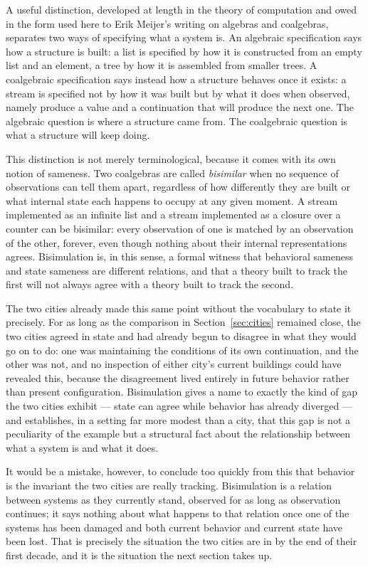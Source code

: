 \documentclass[11pt]{article}
\begin{document}
A useful distinction, developed at length in the theory of computation
and owed in the form used here to Erik Meijer's writing on algebras
and coalgebras, separates two ways of specifying what a system is. An
algebraic specification says how a structure is built: a list is
specified by how it is constructed from an empty list and an element,
a tree by how it is assembled from smaller trees. A coalgebraic
specification says instead how a structure behaves once it exists: a
stream is specified not by how it was built but by what it does when
observed, namely produce a value and a continuation that will produce
the next one. The algebraic question is where a structure came from.
The coalgebraic question is what a structure will keep doing.

This distinction is not merely terminological, because it comes with
its own notion of sameness. Two coalgebras are called \emph{bisimilar}
when no sequence of observations can tell them apart, regardless of
how differently they are built or what internal state each happens to
occupy at any given moment. A stream implemented as an infinite list
and a stream implemented as a closure over a counter can be
bisimilar: every observation of one is matched by an observation of
the other, forever, even though nothing about their internal
representations agrees. Bisimulation is, in this sense, a formal
witness that behavioral sameness and state sameness are different
relations, and that a theory built to track the first will not always
agree with a theory built to track the second.

The two cities already made this same point without the vocabulary
to state it precisely. For as long as the comparison in
Section~\ref{sec:cities} remained close, the two cities agreed in
state and had already begun to disagree in what they would go on to
do: one was maintaining the conditions of its own continuation, and
the other was not, and no inspection of either city's current
buildings could have revealed this, because the disagreement lived
entirely in future behavior rather than present configuration.
Bisimulation gives a name to exactly the kind of gap the two cities
exhibit --- state can agree while behavior has already diverged --- and
establishes, in a setting far more modest than a city, that this gap
is not a peculiarity of the example but a structural fact about the
relationship between what a system is and what it does.

It would be a mistake, however, to conclude too quickly from this
that behavior is the invariant the two cities are really tracking.
Bisimulation is a relation between systems as they currently stand,
observed for as long as observation continues; it says nothing about
what happens to that relation once one of the systems has been
damaged and both current behavior and current state have been lost.
That is precisely the situation the two cities are in by the end of
their first decade, and it is the situation the next section takes
up.
\end{document}

